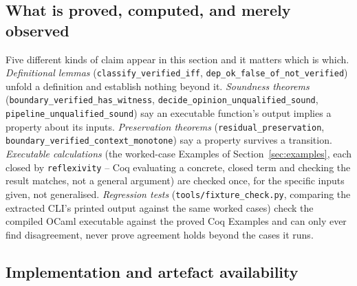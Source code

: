\documentclass[smallcondensed,envcountsect,natbib]{svjour3}
\begin{document}
\subsection*{What is proved, computed, and merely observed}

Five different kinds of claim appear in this section and it matters which is which. \emph{Definitional lemmas} (\texttt{classify\_verified\_iff}, \texttt{dep\_ok\_false\_of\_not\_verified}) unfold a definition and establish nothing beyond it. \emph{Soundness theorems} (\texttt{boundary\_verified\_has\_witness}, \texttt{decide\_opinion\_unqualified\_sound}, \texttt{pipeline\_unqualified\_sound}) say an executable function's output implies a property about its inputs. \emph{Preservation theorems} (\texttt{residual\_preservation}, \texttt{boundary\_verified\_context\_monotone}) say a property survives a transition. \emph{Executable calculations} (the worked-case Examples of Section~\ref{sec:examples}, each closed by \texttt{reflexivity} -- Coq evaluating a concrete, closed term and checking the result matches, not a general argument) are checked once, for the specific inputs given, not generalised. \emph{Regression tests} (\texttt{tools/fixture\_check.py}, comparing the extracted CLI's printed output against the same worked cases) check the compiled OCaml executable against the proved Coq Examples and can only ever find disagreement, never prove agreement holds beyond the cases it runs.

\subsection*{Implementation and artefact availability}
\end{document}
